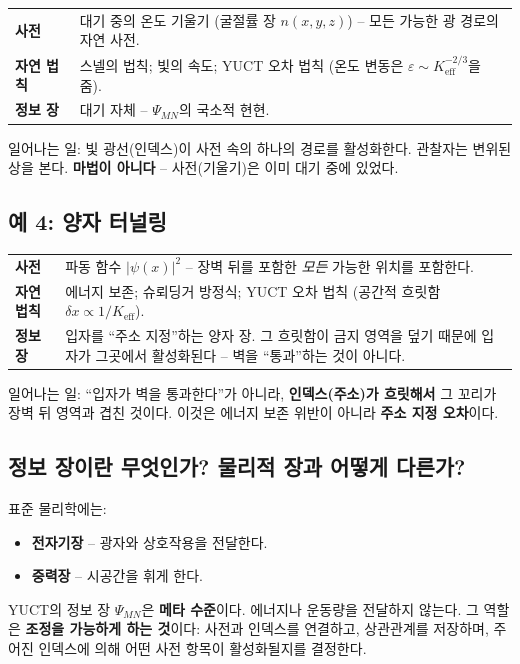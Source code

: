 \documentclass[12pt,a4paper]{article}
\begin{document}
	\begin{tabular}{p{2.8cm} p{10cm}}
		\textbf{사전} & 대기 중의 온도 기울기 (굴절률 장 \(n(x,y,z)\)) – 모든 가능한 광 경로의 자연 사전. \\
		\textbf{자연 법칙} & 스넬의 법칙; 빛의 속도; YUCT 오차 법칙 (온도 변동은 \(\varepsilon \sim K_{\mathrm{eff}}^{-2/3}\)을 줌). \\
		\textbf{정보 장} & 대기 자체 – \(\Psi_{MN}\)의 국소적 현현. \\
	\end{tabular}
	
	\noindent 일어나는 일: 빛 광선(인덱스)이 사전 속의 하나의 경로를 활성화한다. 관찰자는 변위된 상을 본다. \textbf{마법이 아니다} – 사전(기울기)은 이미 대기 중에 있었다.
	
	\subsection{예 4: 양자 터널링}
	
	\begin{tabular}{p{2.8cm} p{10cm}}
		\textbf{사전} & 파동 함수 \(|\psi(x)|^2\) – 장벽 뒤를 포함한 \emph{모든} 가능한 위치를 포함한다. \\
		\textbf{자연 법칙} & 에너지 보존; 슈뢰딩거 방정식; YUCT 오차 법칙 (공간적 흐릿함 \(\delta x \propto 1/K_{\mathrm{eff}}\)). \\
		\textbf{정보 장} & 입자를 “주소 지정”하는 양자 장. 그 흐릿함이 금지 영역을 덮기 때문에 입자가 그곳에서 활성화된다 – 벽을 “통과”하는 것이 아니다. \\
	\end{tabular}
	
	\noindent 일어나는 일: “입자가 벽을 통과한다”가 아니라, \textbf{인덱스(주소)가 흐릿해서} 그 꼬리가 장벽 뒤 영역과 겹친 것이다. 이것은 에너지 보존 위반이 아니라 \textbf{주소 지정 오차}이다.
	
	\subsection{정보 장이란 무엇인가? 물리적 장과 어떻게 다른가?}
	
	표준 물리학에는:
	\begin{itemize}
		\item \textbf{전자기장} – 광자와 상호작용을 전달한다.
		\item \textbf{중력장} – 시공간을 휘게 한다.
	\end{itemize}
	YUCT의 정보 장 \(\Psi_{MN}\)은 \textbf{메타 수준}이다. 에너지나 운동량을 전달하지 않는다. 그 역할은 \textbf{조정을 가능하게 하는 것}이다: 사전과 인덱스를 연결하고, 상관관계를 저장하며, 주어진 인덱스에 의해 어떤 사전 항목이 활성화될지를 결정한다.
	
\end{document}
